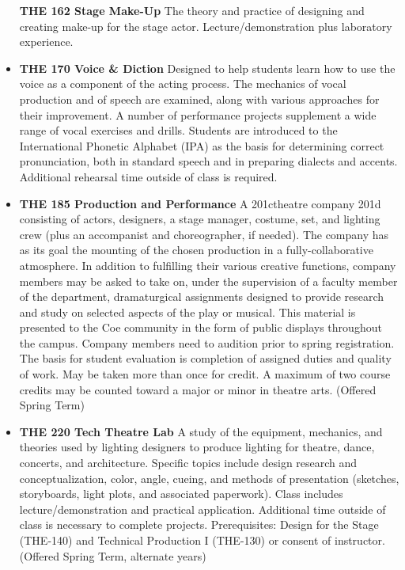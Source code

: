 \documentclass[
  letterpaper,
]{scrbook}
\begin{document}
\begin{itemize}
  \textbf{THE 162 Stage Make-Up} The theory and practice of designing
  and creating make-up for the stage actor. Lecture/demonstration plus
  laboratory experience.
\item
  \textbf{THE 170 Voice \& Diction} Designed to help students learn how
  to use the voice as a component of the acting process. The mechanics
  of vocal production and of speech are examined, along with various
  approaches for their improvement. A number of performance projects
  supplement a wide range of vocal exercises and drills. Students are
  introduced to the International Phonetic Alphabet (IPA) as the basis
  for determining correct pronunciation, both in standard speech and in
  preparing dialects and accents. Additional rehearsal time outside of
  class is required.\\
\item
  \textbf{THE 185 Production and Performance} A 201ctheatre company 201d
  consisting of actors, designers, a stage manager, costume, set, and
  lighting crew (plus an accompanist and choreographer, if needed). The
  company has as its goal the mounting of the chosen production in a
  fully-collaborative atmosphere. In addition to fulfilling their
  various creative functions, company members may be asked to take on,
  under the supervision of a faculty member of the department,
  dramaturgical assignments designed to provide research and study on
  selected aspects of the play or musical. This material is presented to
  the Coe community in the form of public displays throughout the
  campus. Company members need to audition prior to spring registration.
  The basis for student evaluation is completion of assigned duties and
  quality of work. May be taken more than once for credit. A maximum of
  two course credits may be counted toward a major or minor in theatre
  arts. (Offered Spring Term)
\item
  \textbf{THE 220 Tech Theatre Lab} A study of the equipment, mechanics,
  and theories used by lighting designers to produce lighting for
  theatre, dance, concerts, and architecture. Specific topics include
  design research and conceptualization, color, angle, cueing, and
  methods of presentation (sketches, storyboards, light plots, and
  associated paperwork). Class includes lecture/demonstration and
  practical application. Additional time outside of class is necessary
  to complete projects. Prerequisites: Design for the Stage (THE-140)
  and Technical Production I (THE-130) or consent of instructor.
  (Offered Spring Term, alternate years)\\

\end{itemize}
\end{document}
